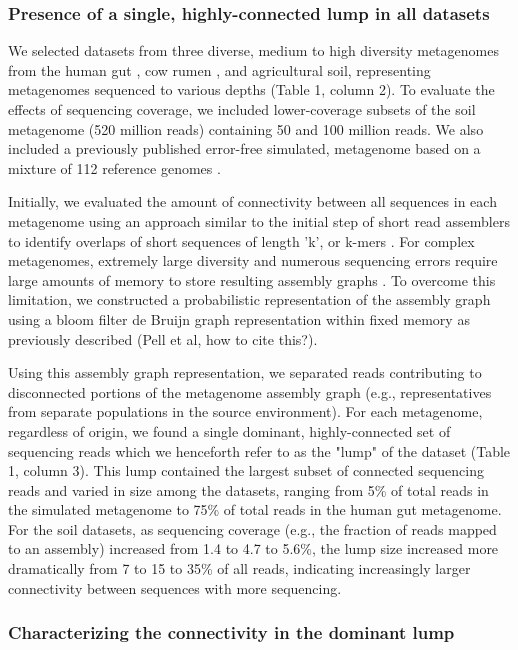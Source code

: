 \documentclass[10pt]{article}
\begin{document}
\subsubsection*{Presence of a single, highly-connected lump in all datasets}
We selected datasets from three diverse, medium to high diversity metagenomes from the human gut \cite{Qin:2010p189}, cow rumen \cite{Hess:2011p686}, and agricultural soil, representing metagenomes sequenced to various depths (Table 1, column 2).  To evaluate the effects of sequencing coverage, we included lower-coverage subsets of the soil metagenome (520 million reads) containing 50 and 100 million reads.  We also included a previously published error-free simulated, metagenome based on a mixture of 112 reference genomes \cite{Pignatelli:2011p742}.

Initially, we evaluated the amount of connectivity between all sequences in each metagenome using an approach similar to the initial step of short read assemblers to identify overlaps of short sequences of length 'k', or k-mers \cite{Peng:2011p898,Simpson:2009p233,Zerbino:2008p665}.  For complex metagenomes, extremely large diversity and numerous sequencing errors require large amounts of memory to store resulting assembly graphs \cite{Hess:2011p686,Mackelprang:2011p1087,Qin:2010p189}.  To overcome this limitation, we constructed a probabilistic representation of the assembly graph using a bloom filter de Bruijn graph representation within fixed memory as previously described (Pell et al, how to cite this?).  

Using this assembly graph representation, we separated reads contributing to disconnected portions of the metagenome assembly graph (e.g., representatives from separate populations in the source environment).  For each metagenome, regardless of origin, we found a single dominant, highly-connected set of sequencing reads which we henceforth refer to as the  "lump"  of the dataset (Table 1, column 3).  This lump contained the largest subset of connected sequencing reads and varied in size among the datasets, ranging from 5\% of total reads in the simulated metagenome to 75\% of total reads in the human gut metagenome.  For the soil datasets, as sequencing coverage (e.g., the fraction of reads mapped to an assembly) increased from 1.4 to 4.7 to 5.6\%, the lump size increased more dramatically from 7 to 15 to 35\% of all reads, indicating increasingly larger connectivity between sequences with more sequencing.

\subsubsection*{Characterizing the connectivity in the dominant lump}
\end{document}
